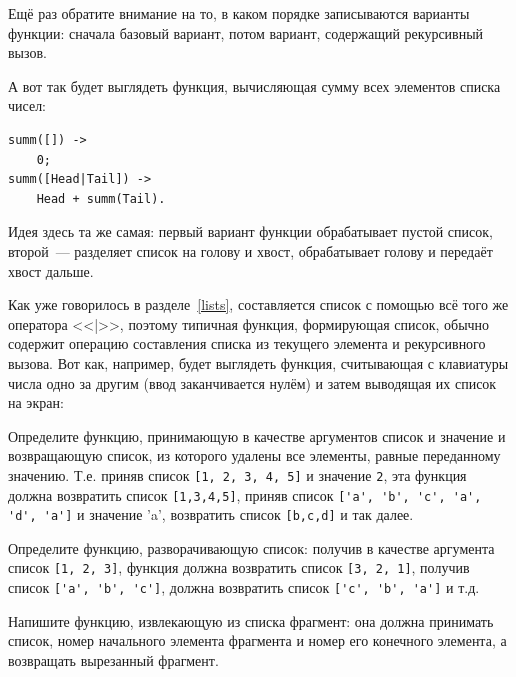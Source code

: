 \documentclass[
  paper=a4,
  fontsize=14pt,
  openany,
  appendixprefix=true
]{scrbook}
\begin{document}

Ещё раз обратите внимание на то, в каком порядке записываются варианты функции: сначала базовый вариант, потом вариант, содержащий рекурсивный вызов.

А вот так будет выглядеть функция, вычисляющая сумму всех элементов списка чисел:

\label{listsumm}
\begin{lstlisting}
summ([]) ->
    0;
summ([Head|Tail]) ->
    Head + summ(Tail).
\end{lstlisting}

Идея здесь та же самая: первый вариант функции обрабатывает пустой список, второй~--- разделяет список на голову и хвост, обрабатывает голову и передаёт хвост дальше.

Как уже говорилось в разделе~\ref{lists}, составляется список с помощью всё того же оператора <<|>>, поэтому типичная функция, формирующая список, обычно содержит операцию составления списка из текущего элемента и рекурсивного вызова. Вот как, например, будет выглядеть функция, считывающая с клавиатуры числа одно за другим (ввод заканчивается нулём) и затем выводящая их список на экран:



\begin{problem}\label{rember}
Определите функцию, принимающую в качестве аргументов список и значение и возвращающую список, из которого удалены все элементы, равные переданному значению. Т.е. приняв список \lstinline{[1, 2, 3, 4, 5]} и значение \lstinline{2}, эта функция должна возвратить список \lstinline{[1,3,4,5]}, приняв список \lstinline{['a', 'b', 'c', 'a', 'd', 'a']} и значение 'a', возвратить список \lstinline{[b,c,d]} и так далее.\cite[33]{little_schemer}
\end{problem}

\begin{problem}\label{listrev}
Определите функцию, разворачивающую список: получив в качестве аргумента список \lstinline{[1, 2, 3]}, функция должна возвратить список \lstinline{[3, 2, 1]}, получив список \lstinline{['a', 'b', 'c']}, должна возвратить список \lstinline{['c', 'b', 'a']} и т.д.
\end{problem}

\begin{problem}\label{slice}
Напишите функцию, извлекающую из списка фрагмент: она должна принимать список, номер начального элемента фрагмента и номер его конечного элемента, а возвращать вырезанный фрагмент.
\end{problem}
\end{document}
